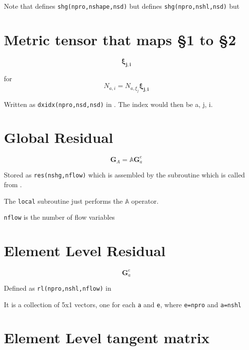 \documentclass[12pt, letterpaper, twoside]{article}
\renewcommand{\vec}[1]{\bm{#1}}
\newcommand{\ttt}[1]{\texttt{#1}}
\newcommand{\0}{\vec{0}}
\begin{document}
    Note that  defines \texttt{shg(npro,nshape,nsd)} but  defines \texttt{shg(npro,nshl,nsd)} but 

\section{Metric tensor that maps \S1 to \S2}

\begin{equation}
    \vec{\xi_{j,i}}
\end{equation}

for 
\begin{equation}
    N_{a,i} = N_{a,\xi_j}\vec{\xi_{j,i}}
\end{equation}

Written as \texttt{dxidx(npro,nsd,nsd)} in . The index would then be a, j, i.

\section{Global Residual}
\begin{equation}
    \vec{G}_A = \mathbb{A} \vec{G}^e_a
\end{equation}

Stored as \ttt{res(nshg,nflow)} which is assembled by the subroutine  which is called from .

The \ttt{local} subroutine just performs the \(\mathbb{A}\) operator.

\ttt{nflow} is the number of flow variables

\section{Element Level Residual}

    \begin{equation}
        \vec{G}^e_a
    \end{equation}

    Defined as \texttt{rl(npro,nshl,nflow)} in  

    It is a collection of 5x1 vectors, one for each \ttt{a} and \ttt{e}, where \ttt{e=npro} and \ttt{a=nshl}

\section{Element Level tangent matrix}
\end{document}
